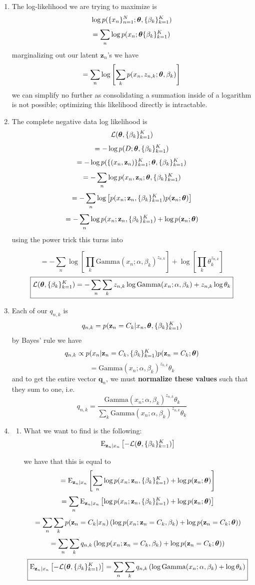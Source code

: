 \documentclass[submit]{harvardml}
\begin{document}
\begin{enumerate}
  \item
  The log-likelihood we are trying to maximize is
  $$\log p(\{x_n\}^N_{n=1}; \boldsymbol{\theta}, \{\beta_k\}^K_{k = 1})$$
  $$=\sum_n\log p(x_n;\boldsymbol{\theta} \{\beta_k\}^K_{k = 1})$$
  marginalizing out our latent $\mathbf{z}_n$'s we have
  $$=\sum_n\log \left[ \sum_k p(x_n,z_{n,k};\boldsymbol{\theta},\beta_k) \right]$$
 we can simplify no further as consolidating a summation inside of a logarithm is not possible; optimizing this likelihood directly is intractable.
  
  \item 
  The complete negative data log likelihood is 
  $$\mathcal{L}(\boldsymbol{\theta},\{\beta_k\}^K_{k=1})$$
  $$=-\log p(D; \boldsymbol{\theta},\{\beta_k\}^K_{k=1})$$
  $$=-\log p(\{(x_n, \mathbf{z}_n)\}^K_{k=1};\boldsymbol{\theta},\{\beta_k\}^K_{k=1})$$
  $$=-\sum_n \log p(x_n, \mathbf{z}_n; \boldsymbol{\theta}, \{\beta_k\}^K_{k=1})$$
  $$=-\sum_n \log\left[p(x_n;\mathbf{z}_n, \{\beta_k\}^K_{k=1})p(\mathbf{z}_n;\boldsymbol{\theta})\right]$$
  $$=-\sum_n \log p(x_n;\mathbf{z}_n, \{\beta_k\}^K_{k=1}) +\log p(\mathbf{z}_n;\boldsymbol{\theta})$$
  using the power trick this turns into
  
  $$=-\sum_n \log\left[\prod_k\mathrm{Gamma}(x_n;\alpha,\beta_k)^{z_{n,k}}\right]+\log\left[\prod_k \theta_k^{z_{n,k}}\right]$$
  $$\boxed{\mathcal{L}(\boldsymbol{\theta},\{\beta_k\}^K_{k=1})=-\sum_n \sum_k z_{n,k}\log\mathrm{Gamma}(x_n;\alpha,\beta_k)+z_{n,k}\log\theta_k}$$


  \item 
  Each of our $q_{n,k}$ is
  $$q_{n,k}=p(\mathbf{z}_n=C_k|x_n,\boldsymbol{\theta},\{\beta_k\}^K_{k=1})$$
  by Bayes' rule we have
  $$q_{n,k}\propto p(x_n|\mathbf{z}_n=C_k,\{\beta_k\}^K_{k=1})p(\mathbf{z}_n=C_k;\boldsymbol{\theta})$$
  $$= \mathrm{Gamma}(x_n;\alpha,\beta_k)^{z_{n,k}}\theta_k$$
  and to get the entire vector $\mathbf{q}_n$, we must \textbf{normalize these values} such that they sum to one, i.e.
  $$\boxed{q_{n,k}=\frac{\mathrm{Gamma}(x_n;\alpha,\beta_k)^{z_{n,k}}\theta_k}{\sum_k \mathrm{Gamma}(x_n;\alpha,\beta_k)^{z_{n,k}}\theta_k}}$$
  
  \item 
    \begin{enumerate}
      \item 
      What we want to find is the following:
      $$\mathrm{E}_{\mathbf{z}_n|x_n}\left[-\mathcal{L}(\boldsymbol{\theta},\{\beta_k\}^K_{k=1})\right]$$
      
      we have that this is equal to
      $$=\mathrm{E}_{\mathbf{z}_n|x_n}\left[\sum_n\log p(x_n;\mathbf{z}_n,\{\beta_k\}^K_{k=1})+\log p(\mathbf{z}_n;\boldsymbol{\theta})\right]$$
      $$=\sum_n\mathrm{E}_{\mathbf{z}_n|x_n}\left[\log p(x_n;\mathbf{z}_n,\{\beta_k\}^K_{k=1})+\log p(\mathbf{z}_n;\boldsymbol{\theta})\right]$$
      $$=\sum_n\sum_k p(\mathbf{z}_n=C_k|x_n)\left(\log p(x_n;\mathbf{z}_n=C_k,\beta_k)+\log p(\mathbf{z}_n=C_k;\boldsymbol{\theta})\right)$$
      $$=\sum_n\sum_k q_{n,k}\left(\log p(x_n;\mathbf{z}_n=C_k,\beta_k)+\log p(\mathbf{z}_n=C_k;\boldsymbol{\theta})\right)$$
      $$\boxed{\mathrm{E}_{\mathbf{z}_n|x_n}\left[-\mathcal{L}(\boldsymbol{\theta},\{\beta_k\}^K_{k=1})\right]=\sum_n\sum_k q_{n,k}\left(\log\mathrm{Gamma}(x_n;\alpha,\beta_k)+\log \theta_k\right)}$$
      

\end{enumerate}
\end{enumerate}
\end{document}
